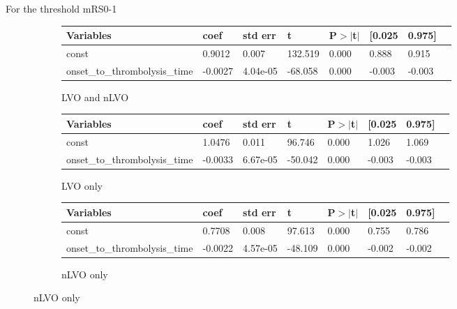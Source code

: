 For the threshold mRS0-1



\begin{figure}[!h]
    \begin{subfigure}[b]{1\textwidth}
    \centering
        \begin{tabular}{llllllll}
        \toprule
        Variables & coef & std err & t & P$>$$|$t$|$ & [0.025 & 0.975] \\ \midrule
        const            &              0.9012  &    0.007  &  132.519   &   0.000  &     0.888  &     0.915\\
        onset\_to\_thrombolysis\_time  &  -0.0027  & 4.04e-05  & -68.058  &    0.000   &   -0.003   &   -0.003    \\    \bottomrule
        \end{tabular}
      \caption{LVO and nLVO}
      \label{fig:stats_table_lvo_nlvo_mrs1}
    \end{subfigure}



    \vspace{15mm}
    \begin{subfigure}[b]{1\textwidth}
      \centering    
        \begin{tabular}{llllllll}
        \toprule
        Variables & coef & std err & t & P$>$$|$t$|$ & [0.025 & 0.975] \\ \midrule
        const                  &        1.0476  &    0.011  &   96.746  &    0.000   &    1.026 &      1.069\\
        onset\_to\_thrombolysis\_time  &  -0.0033 &  6.67e-05  &  -50.042   &   0.000  &    -0.003   &   -0.003\\
        \bottomrule
        \end{tabular}
      \caption{LVO only}
      \label{fig:stats_table_lvo_mrs1}
    \end{subfigure}


    \vspace{15mm}
    \begin{subfigure}[b]{1\textwidth}
      \centering
       \begin{tabular}{llllllll}
        \toprule
        Variables & coef & std err & t & P$>$$|$t$|$ & [0.025 & 0.975] \\ \midrule
        const               &           0.7708 &     0.008   &  97.613 &     0.000 &      0.755 &      0.786\\
        onset\_to\_thrombolysis\_time  &  -0.0022 &   4.57e-05 &    -48.109    &  0.000   &   -0.002   &   -0.002\\
        \bottomrule
        \end{tabular}
        \caption{nLVO only}
      \label{fig:stats_table_nlvo_mrs1}
    \end{subfigure}
    \label{fig:stats_table_mrs1}
\end{figure}

